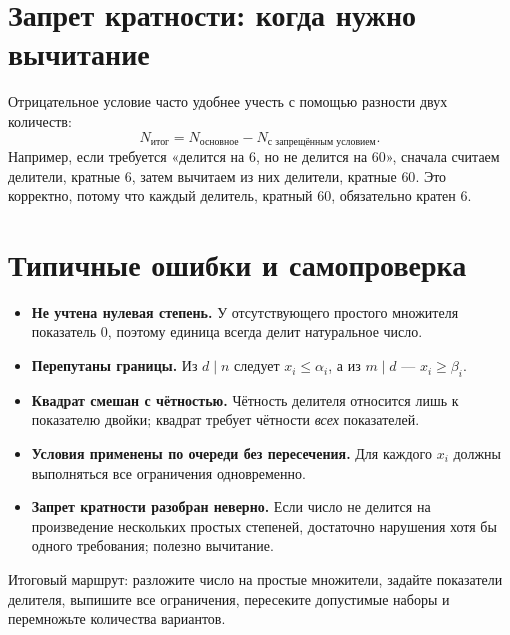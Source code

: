\documentclass[a4paper,12pt]{article}
\newcommand{\Section}[1]{\vspace{4pt}\section{\textcolor{darkaccent}{#1}}\vspace{-4pt}}
\newcommand{\Key}[1]{\textcolor{darkaccent}{#1}}
\begin{document}
\Section{Запрет кратности: когда нужно вычитание}
Отрицательное условие часто удобнее учесть с помощью разности двух количеств:
\[
\boxed{N_{\text{итог}}=N_{\text{основное}}-N_{\text{с запрещённым условием}}.}
\]
Например, если требуется «делится на $6$, но не делится на $60$», сначала считаем делители, кратные $6$, затем вычитаем из них делители, кратные $60$. Это корректно, потому что каждый делитель, кратный $60$, обязательно кратен $6$.

\Section{Типичные ошибки и самопроверка}
\begin{itemize}
\item \textbf{Не учтена нулевая степень.} У отсутствующего простого множителя показатель $0$, поэтому единица всегда делит натуральное число.
\item \textbf{Перепутаны границы.} Из $d\mid n$ следует $x_i\le\alpha_i$, а из $m\mid d$ — $x_i\ge\beta_i$.
\item \textbf{Квадрат смешан с чётностью.} Чётность делителя относится лишь к показателю двойки; квадрат требует чётности \emph{всех} показателей.
\item \textbf{Условия применены по очереди без пересечения.} Для каждого $x_i$ должны выполняться все ограничения одновременно.
\item \textbf{Запрет кратности разобран неверно.} Если число не делится на произведение нескольких простых степеней, достаточно нарушения хотя бы одного требования; полезно вычитание.
\end{itemize}
\Key{Итоговый маршрут:} разложите число на простые множители, задайте показатели делителя, выпишите все ограничения, пересеките допустимые наборы и перемножьте количества вариантов.
\end{document}

